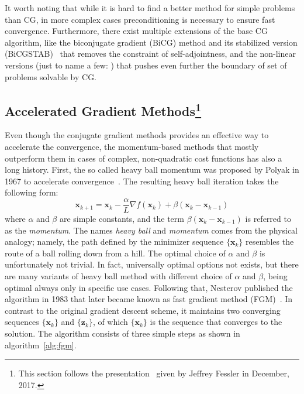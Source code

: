 It worth noting that while it is hard to find a better method for simple problems than CG, in more complex cases preconditioning is necessary to ensure fast convergence. Furthermore, there exist multiple extensions of the base CG algorithm, like the biconjugate gradient (BiCG) method and its stabilized version (BiCGSTAB)~\cite{van_der_vorst_bicgstab_1992} that removes the constraint of self-adjointness, and the non-linear versions (just to name a few: \cite{fletcher_function_1964, polak_note_1969, dai_nonlinear_1999}) that pushes even further the boundary of set of problems solvable by CG.

\subsection[Accelerated Gradient Methods]{Accelerated Gradient Methods\footnote{This section follows the presentation~\cite{kim_optimal_2017} given by Jeffrey Fessler in December, 2017.}}

Even though the conjugate gradient methods provides an effective way to accelerate the convergence, the momentum-based methods that mostly outperform them in cases of complex, non-quadratic cost functions has also a long history. First, the so called heavy ball momentum was proposed by Polyak in 1967 to accelerate convergence~\cite{polyak_methods_1964}. The resulting heavy ball iteration takes the following form:
\[\mathbf{x}_{k+1} = \mathbf{x}_k - \frac{\alpha}{L}\nabla f(\mathbf{x}_k) + \beta (\mathbf{x}_k - \mathbf{x}_{k-1})\]
where $\alpha$ and $\beta$ are simple constants, and the term $\beta (\mathbf{x}_k - \mathbf{x}_{k-1})$ is referred to as the \textit{momentum}. The names \textit{heavy ball} and \textit{momentum} comes from the physical analogy; namely, the path defined by the minimizer sequence $\{\mathbf{x}_k\}$ resembles the route of a ball rolling down from a hill. The optimal choice of $\alpha$ and $\beta$ is unfortunately not trivial. In fact, universally optimal options not exists, but there are many variants of heavy ball method with different choice of $\alpha$ and $\beta$, being optimal always only in specific use cases. Following that, Nesterov published the algorithm in 1983 that later became known as fast gradient method (FGM)~\cite{nesterov_method_1983}. In contrast to the original gradient descent scheme, it maintains two converging sequences $\{\mathbf{x}_k\}$ and $\{\mathbf{z}_k\}$, of which $\{\mathbf{x}_k\}$ is the sequence that converges to the solution. The algorithm consists of three simple steps as shown in algorithm~\ref{alg:fgm}.

